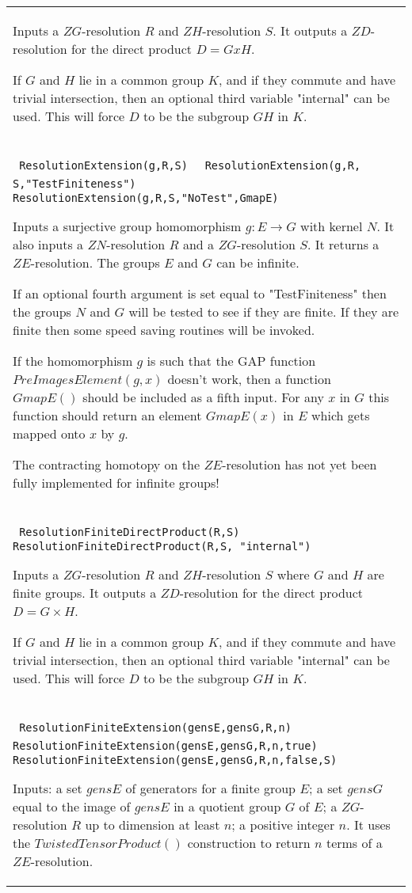 \documentclass[a4paper,11pt]{report}
\begin{document}
{\begin{center}
\begin{tabular}{|l|}
 Inputs a $ZG$-resolution $R$ and $ZH$-resolution $S$. It outputs a $ZD$-resolution for the direct product $D=G x H$.

 If $G$ and $H$ lie in a common group $K$, and if they commute and have trivial intersection, then an optional third
variable "internal" can be used. This will force $D$ to be the subgroup $GH$ in $K$. \\
 \index{ResolutionExtension} \texttt{ ResolutionExtension(g,R,S) } {\nobreakspace} \texttt{ ResolutionExtension(g,R, S,"TestFiniteness")} {\nobreakspace} \texttt{ ResolutionExtension(g,R,S,"NoTest",GmapE)} 

 Inputs a surjective group homomorphism $g:E \longrightarrow G$ with kernel $N$. It also inputs a $ZN$-resolution $R$ and a $ZG$-resolution $S$. It returns a $ZE$-resolution. The groups $E$ and $G$ can be infinite.

 If an optional fourth argument is set equal to "TestFiniteness" then the
groups $N$ and $G$ will be tested to see if they are finite. If they are finite then some speed
saving routines will be invoked.

 If the homomorphism $g$ is such that the GAP function $PreImagesElement(g,x)$ doesn't work, then a function $GmapE()$ should be included as a fifth input. For any $x$ in $G$ this function should return an element $GmapE(x)$ in $E$ which gets mapped onto $x$ by $g$.

 The contracting homotopy on the $ZE$-resolution has not yet been fully implemented for infinite groups! \\
 \index{ResolutionFiniteDirectProduct} \texttt{ ResolutionFiniteDirectProduct(R,S) } {\nobreakspace} \texttt{ ResolutionFiniteDirectProduct(R,S, "internal")} 

 Inputs a $ZG$-resolution $R$ and $ZH$-resolution $S$ where $G$ and $H$ are finite groups. It outputs a $ZD$-resolution for the direct product $D=G×H$.

 If $G$ and $H$ lie in a common group $K$, and if they commute and have trivial intersection, then an optional third
variable "internal" can be used. This will force $D$ to be the subgroup $GH$ in $K$. \\
 \index{ResolutionFiniteExtension} \texttt{ ResolutionFiniteExtension(gensE,gensG,R,n)} {\nobreakspace} \texttt{ ResolutionFiniteExtension(gensE,gensG,R,n,true) } {\nobreakspace} \texttt{ ResolutionFiniteExtension(gensE,gensG,R,n,false,S) } 

 Inputs: a set $gensE$ of generators for a finite group $E$; a set $gensG$ equal to the image of $gensE$ in a quotient group $G$ of $E$; a $ZG$-resolution $R$ up to dimension at least $n$; a positive integer $n$. It uses the $TwistedTensorProduct()$ construction to return $n$ terms of a $ZE$-resolution.


\end{tabular}
\end{center}}
\end{document}

